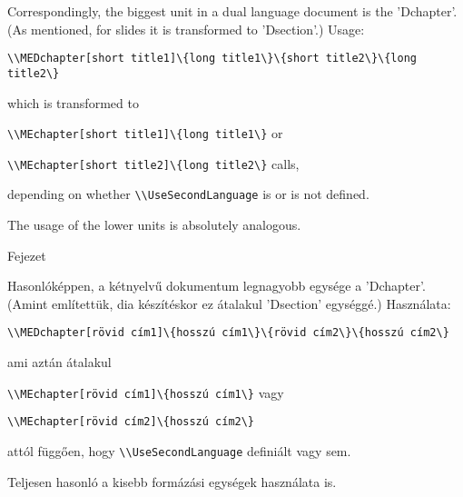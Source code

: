 
{
Correspondingly, the biggest unit in a dual language document is the 'Dchapter'.
(As mentioned, for slides it is transformed to 'Dsection'.)
Usage:\par
\noindent\lstinline|\\MEDchapter[short title1]\{long title1\}\{short title2\}\{long title2\}|
\par\noindent which is transformed to
\par\noindent\lstinline|\\MEchapter[short title1]\{long title1\}| or
\par\noindent\lstinline|\\MEchapter[short title2]\{long title2\}| calls,
\par\noindent depending on whether \lstinline|\\UseSecondLanguage| is or is not defined.

The usage of the lower units is absolutely analogous.

}
{Fejezet}
{

Hasonlóképpen, a kétnyelvű dokumentum legnagyobb egysége a 'Dchapter'.
(Amint említettük, dia készítéskor ez átalakul 'Dsection' egységgé.)
Használata:\par
\noindent\lstinline|\\MEDchapter[rövid cím1]\{hosszú cím1\}\{rövid cím2\}\{hosszú cím2\}|
\par\noindent ami aztán átalakul 
\par\noindent\lstinline|\\MEchapter[rövid cím1]\{hosszú cím1\}| vagy
\par\noindent\lstinline|\\MEchapter[rövid cím2]\{hosszú cím2\}| 
\par\noindent attól függően, hogy  \lstinline|\\UseSecondLanguage| definiált vagy sem.

Teljesen hasonló a kisebb formázási egységek használata is.

}


